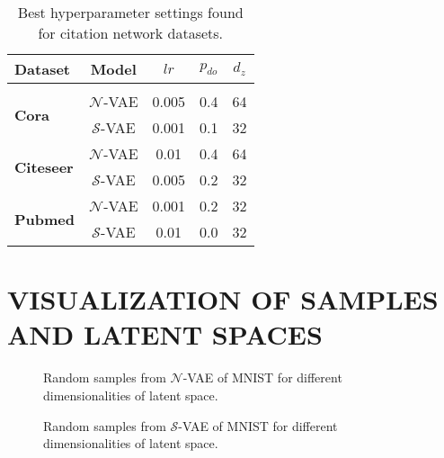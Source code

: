 \documentclass[letterpaper]{article}
\begin{document}
\begin{table}[htp]
\centering
\caption{\label{tab:link-params}Best hyperparameter settings found for citation network datasets.}
\bigskip
\begin{tabular}{l c c c c}
\toprule
Dataset & Model & $lr$ & $p_{do}$  & $d_z$ \\[0.05em]\hline \\[-0.8em]
\multirow{2}{0pt}{\textbf{Cora}}     & $\mathcal{N}$-VAE & 0.005  & 0.4 & 64 \\
                                  & $\mathcal{S}$-VAE & 0.001 & 0.1 & 32 \\ \midrule
\multirow{2}{0pt}{\textbf{Citeseer}} & $\mathcal{N}$-VAE & 0.01  & 0.4 & 64 \\
                                  & $\mathcal{S}$-VAE & 0.005 & 0.2 & 32 \\ \midrule
\multirow{2}{0pt}{\textbf{Pubmed}}   & $\mathcal{N}$-VAE & 0.001 & 0.2 & 32 \\
                                  & $\mathcal{S}$-VAE & 0.01 & 0.0 & 32 \\
                                \bottomrule
\end{tabular}
\end{table}

\newpage
\section{VISUALIZATION OF SAMPLES AND LATENT SPACES} \label{app:mnist-latent-visual}

\begin{figure*}[h!]
\centering
\caption{Random samples from $\mathcal{N}$-VAE of MNIST for different dimensionalities of latent space.}
\label{fig:nvae_samples}
\end{figure*}

\begin{figure*}[h!]
\centering
\caption{Random samples from $\mathcal{S}$-VAE of MNIST for different dimensionalities of latent space.}
\label{fig:svae_samples}
\end{figure*}
\end{document}
